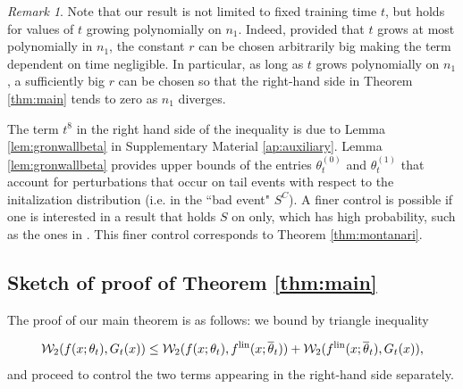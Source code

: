 \documentclass{article}
\theoremstyle{definition}
\theoremstyle{remark}
\newtheorem{rem}[thm]{Remark}
\numberwithin{equation}{section}
\newcommand{\lin}{{\textup{lin}}}
\begin{document}
\begin{rem}
    \label{rem:time}
    Note that our result is not limited to fixed training time $t$, but holds for values of $t$ growing polynomially on $n_1$.
    Indeed, provided that $t$ grows at most polynomially in $n_1$, the constant $r$ can be chosen arbitrarily big making the term dependent on time negligible.
    In particular, as long as $t$ grows polynomially on $n_1$, a sufficiently big $r$ can be chosen so that the right-hand side in Theorem \ref{thm:main} tends to zero as $n_1$ diverges.

    The term $t^8$ in the right hand side of the inequality is due to Lemma \ref{lem:gronwallbeta} in Supplementary Material \ref{ap:auxiliary}.
    Lemma \ref{lem:gronwallbeta} provides upper bounds of the entries $\theta^{(0)}_t$ and $\theta^{(1)}_t$
    that account for perturbations that occur on tail events with respect to the initalization distribution (i.e. in the ``bad event" $S^C$).
    A finer control is possible if one is interested in a result that holds $S$ on only, which has high probability, such as the ones in \cite{Bartlett_Montanari_Rakhlin_2021,bachchizat}. 
    This finer control corresponds to Theorem \ref{thm:montanari}.
\end{rem}

\subsection{Sketch of proof of Theorem \ref{thm:main}}
\label{subsec:sketch}
The proof of our main theorem is as follows: we bound by triangle inequality

\[
    \mathcal W_2(f(x;\theta_t),G_t(x)) \le \mathcal W_2(f(x;\theta_t),f^\lin(x;\overline \theta_t))+\mathcal W_2(f^\lin(x;\overline \theta_t),G_t(x)),
\]
and proceed to control the two terms appearing in the right-hand side separately.
\end{document}
